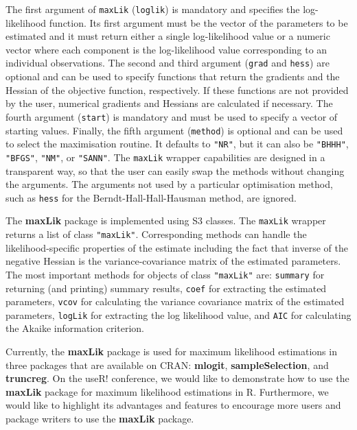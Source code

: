 \documentclass[10pt]{article}
\newcommand{\code}[1]{\texttt{#1}}
\begin{document}
The first argument of \code{maxLik} (\code{loglik})
is mandatory and specifies the log-likelihood function.
Its first argument must be the vector of the parameters to be estimated
and it must return either a single log-likelihood value or
a numeric vector where each component is the log-likelihood value
corresponding to an individual observations.
The second and third argument (\code{grad} and \code{hess})
are optional and can be used to specify functions
that return the gradients and the Hessian of the objective function,
respectively.
If these functions are not provided by the user,
numerical gradients and Hessians are calculated if necessary.
The fourth argument (\code{start}) is mandatory and
must be used to specify a vector of starting values.
Finally, the fifth argument (\code{method}) is optional and
can be used to select the maximisation routine.
It defaults to \code{"NR"}, but it can also be \code{"BHHH"},
\code{"BFGS"}, \code{"NM"}, or \code{"SANN"}.  The \code{maxLik}
wrapper capabilities are designed in a transparent way, so that the
user can easily swap the methods without changing the
arguments.  The arguments not used by a particular optimisation
method, such as \code{hess} for the Berndt-Hall-Hall-Hausman method,
are ignored.

The \textbf{maxLik} package is implemented using S3 classes.
The \code{maxLik} wrapper returns a list of class \code{"maxLik"}.
Corresponding methods can handle the likelihood-specific properties
of the estimate including the fact
that inverse of the negative Hessian is the variance-covariance matrix
of the estimated parameters.
The most important methods for objects of class \code{"maxLik"} are:
\code{summary} for returning (and printing) summary results,
\code{coef} for extracting the estimated parameters,
\code{vcov} for calculating the variance covariance matrix
of the estimated parameters,
\code{logLik} for extracting the log likelihood value, and
\code{AIC} for calculating the Akaike information criterion.

Currently, the \textbf{maxLik} package is used for maximum likelihood
estimations in three packages that are available on CRAN:
\textbf{mlogit}, \textbf{sampleSelection},
and \textbf{truncreg}.
On the useR! conference,
we would like to demonstrate how to use the \textbf{maxLik} package
for maximum likelihood estimations in \textsf{R}.
Furthermore, we would like to highlight its advantages and features
to encourage more users and package writers
to use the \textbf{maxLik} package.

%
%
\end{document}
